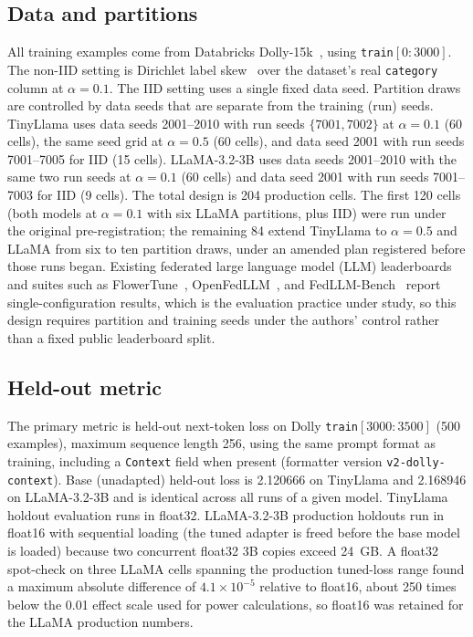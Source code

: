 \subsection{Data and partitions}
All training examples come from Databricks Dolly-15k~\cite{conover2023dolly}, using \texttt{train}$[0{:}3000]$. The non-IID setting is Dirichlet label skew~\cite{hsu2019measuring} over the dataset's real \texttt{category} column at $\alpha{=}0.1$. The IID setting uses a single fixed data seed. Partition draws are controlled by data seeds that are separate from the training (run) seeds. TinyLlama uses data seeds 2001--2010 with run seeds $\{7001, 7002\}$ at $\alpha{=}0.1$
(60 cells), the same seed grid at $\alpha{=}0.5$ (60 cells), and data seed 2001 with run
seeds 7001--7005 for IID (15 cells). LLaMA-3.2-3B uses data seeds 2001--2010 with the same
two run seeds at $\alpha{=}0.1$ (60 cells) and data seed 2001 with run seeds 7001--7003 for
IID (9 cells). The total design is 204 production cells. The first 120 cells (both models at
$\alpha{=}0.1$ with six LLaMA partitions, plus IID) were run under the original
pre-registration; the remaining 84 extend TinyLlama to $\alpha{=}0.5$ and LLaMA from six to
ten partition draws, under an amended plan registered before those runs began. Existing federated large language model (LLM) leaderboards and suites such as FlowerTune~\cite{gao2025flowertune}, OpenFedLLM~\cite{ye2024openfedllm}, and FedLLM-Bench~\cite{ye2024fedllmbench} report single-configuration results, which is the evaluation practice under study, so this design requires partition and training seeds under the authors' control rather than a fixed public leaderboard split.

\subsection{Held-out metric}
The primary metric is held-out next-token loss on Dolly \texttt{train}$[3000{:}3500]$ (500 examples), maximum sequence length 256, using the same prompt format as training, including a \texttt{Context} field when present (formatter version \texttt{v2-dolly-context}). Base (unadapted) held-out loss is 2.120666 on TinyLlama and 2.168946 on LLaMA-3.2-3B and is identical across all runs of a given model. TinyLlama holdout evaluation runs in float32. LLaMA-3.2-3B production holdouts run in float16 with sequential loading (the tuned adapter is freed before the base model is loaded) because two concurrent float32 3B copies exceed 24~GB. A float32 spot-check on three LLaMA cells spanning the production tuned-loss range found a maximum absolute difference of $4.1{\times}10^{-5}$ relative to float16, about 250 times below the 0.01 effect scale used for power calculations, so float16 was retained for the LLaMA production numbers.

